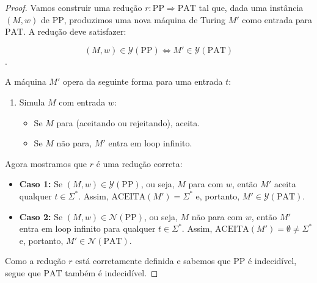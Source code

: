 \documentclass{article}
\begin{document}
\renewcommand{\proofname}{\textbf{Demonstração}}
\begin{proof}
    Vamos construir uma redução $r : \mathrm{PP} \Rightarrow
    \mathrm{PAT}$ tal que, dada uma instância $(M, w)$ de
    $\mathrm{PP}$, produzimos uma nova máquina de Turing $M'$ como
    entrada para $\mathrm{PAT}$. A redução deve satisfazer:

    $$(M, w) \in \mathcal{Y}(\mathrm{PP})
    \iff M' \in \mathcal{Y}(\mathrm{PAT})$$.

    \noindent A máquina $M'$ opera da seguinte forma para uma entrada $t$:

    \begin{enumerate}[itemsep={2pt}, topsep={4pt}, parsep={0pt},
            label={\textbf{\arabic{*}.}}]
        \item Simula $M$ com entrada $w$:
            \begin{itemize}
                \item Se $M$ para (aceitando ou rejeitando), aceita.
                \item Se $M$ não para, $M'$ entra em loop infinito.
            \end{itemize}
    \end{enumerate}

    \vspace{8pt}

    \noindent Agora mostramos que $r$ é uma redução correta:

    \begin{itemize}[itemsep={2pt}, topsep={4pt}]
        \item \textbf{Caso 1:} Se $(M, w) \in
            \mathcal{Y}(\mathrm{PP})$, ou seja, $M$ para com $w$,
            então $M'$ aceita qualquer $t \in \Sigma^{*}$. Assim,
            $\mathrm{ACEITA}(M') = \Sigma^{*}$ e, portanto, $M' \in
            \mathcal{Y}(\mathrm{PAT})$.
        \item \textbf{Caso 2:} Se $(M, w) \in
            \mathcal{N}(\mathrm{PP})$, ou seja, $M$ não para com
            $w$, então $M'$ entra em loop infinito para qualquer $t
            \in \Sigma^{*}$. Assim, $\mathrm{ACEITA}(M') = \emptyset
            \neq \Sigma^{*}$ e, portanto, $M' \in \mathcal{N}(\mathrm{PAT})$.
    \end{itemize}

    \vspace{8pt}

    \noindent Como a redução $r$ está corretamente definida e sabemos
    que $\mathrm{PP}$ é
    indecidível, segue que $\mathrm{PAT}$ também é indecidível.
\end{proof}
\end{document}
